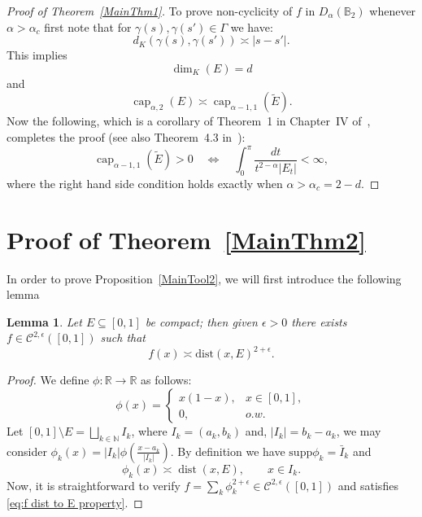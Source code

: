 \documentclass[a4paper,12pt]{amsart}
\newtheorem{lem}[thm]{Lemma}
\theoremstyle{definition}
\theoremstyle{remark}
\def\R{\mathbb R}
\def\B{\mathbb{B}}
\begin{document}
\begin{proof} [Proof of Theorem~\ref{MainThm1}]
To prove non-cyclicity of $f$ in $D_{\alpha}(\B_2)$ whenever $\alpha > \alpha_c$ first note that for $\gamma(s),\gamma(s') \in \Gamma$ we have:
\begin{equation*}
    d_K(\gamma(s),\gamma(s')) \asymp |s - s'|.
\end{equation*}
This implies 
\begin{equation*}
    \dim_{K}(E) = d
\end{equation*}
and
\begin{equation*}
    \operatorname{cap}_{\alpha,2}(E) \asymp \operatorname{cap}_{\alpha-1,1}(\tilde{E}).
\end{equation*}
Now the following, which is a corollary of Theorem~1 in Chapter~IV of~\cite{carleson1967selected}, completes the proof (see also Theorem~4.3 in~\cite{ELFALLAH2010_Cantor}):
\begin{equation*}
    \operatorname{cap}_{\alpha-1,1}(\tilde{E}) > 0 
    \quad \Longleftrightarrow \quad
    \int_{0}^{\pi} \frac{dt}{t^{2 -\alpha} |E_{t}|} < \infty ,
\end{equation*}
where the right hand side condition holds exactly when $\alpha > \alpha_c = 2-d$.


\end{proof}

\section{Proof of Theorem~{\ref{MainThm2}}} \label{Section4}

In order to prove Proposition~{\ref{MainTool2}}, we will first introduce the following lemma
\begin{lem} \label{lem:for MainTool2}
    Let $E \subseteq [0,1]$ be compact; then given $\epsilon > 0$ there exists $f \in \mathcal{C}^{2,\epsilon}\left([0,1]\right)$ such that
    \begin{equation} \label{eq:f dist to E property}
        f(x) \asymp \mathrm{dist}(x,E)^{2+\epsilon}.
    \end{equation}
\end{lem}
\begin{proof}
    We define $\phi:\R \rightarrow \R$ as follows:
    \begin{equation*}
        \phi(x) =
    \begin{cases}
        x(1-x), & x\in [0,1],\\[4pt]
        0, & o.w.
    \end{cases}
    \end{equation*}
    Let $[0,1]\setminus E = \bigsqcup_{k \in \mathbb{N}} I_k$, where $I_k = (a_k,b_k)$ and, $|I_k| = b_k-a_k$, we may consider $\phi_k(x) = |I_k|\phi(\frac{x-a_k}{|I_k|})$. By definition we have $\mathrm{supp}\phi_k = \bar{I}_k$ and
    \begin{equation*}
        \phi_k(x) \asymp \operatorname{dist}(x,E), \qquad x \in I_k.
    \end{equation*}
    Now, it is straightforward to verify $f = \sum_k \phi_k^{2 + \epsilon} \in \mathcal{C}^{2,\epsilon}([0,1])$ and satisfies \eqref{eq:f dist to E property}. 
\end{proof}
\end{document}
